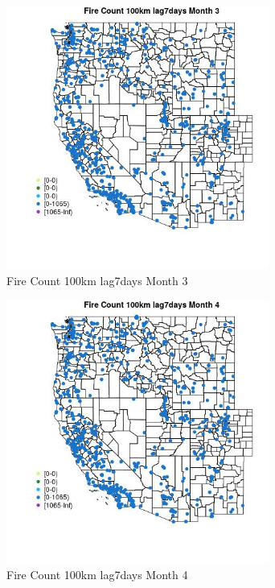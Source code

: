 \begin{figure} 
\centering  
\includegraphics[width=0.77\textwidth]{Code_Outputs/Report_ML_input_PM25_Step4_part_f_de_duplicated_aves_prioritize_24hr_obswNAs_MapObsMo3Fire_Count_100km_lag7days.jpg} 
\caption{\label{fig:Report_ML_input_PM25_Step4_part_f_de_duplicated_aves_prioritize_24hr_obswNAsMapObsMo3Fire_Count_100km_lag7days}Fire Count 100km lag7days Month 3} 
\end{figure} 
 

\begin{figure} 
\centering  
\includegraphics[width=0.77\textwidth]{Code_Outputs/Report_ML_input_PM25_Step4_part_f_de_duplicated_aves_prioritize_24hr_obswNAs_MapObsMo4Fire_Count_100km_lag7days.jpg} 
\caption{\label{fig:Report_ML_input_PM25_Step4_part_f_de_duplicated_aves_prioritize_24hr_obswNAsMapObsMo4Fire_Count_100km_lag7days}Fire Count 100km lag7days Month 4} 
\end{figure} 
 

